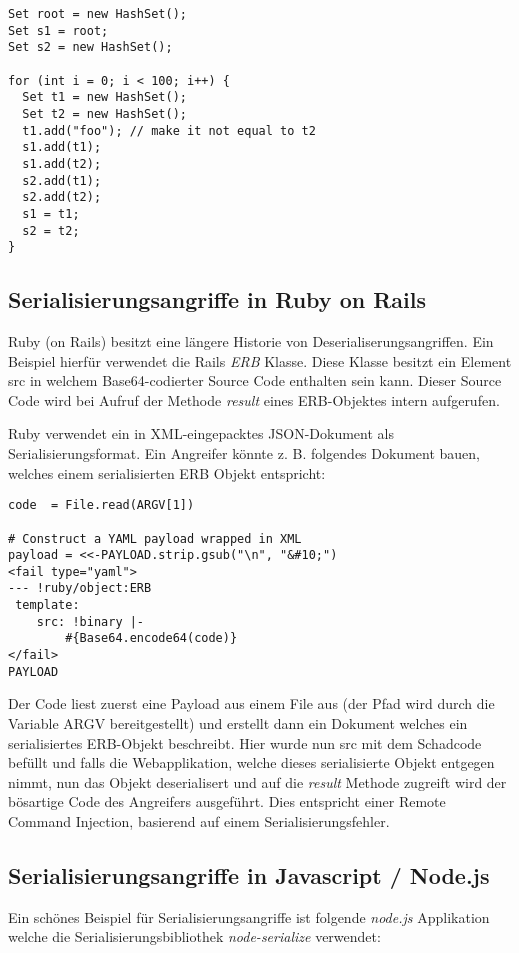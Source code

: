 \begin{verbatim}
Set root = new HashSet();
Set s1 = root;
Set s2 = new HashSet();

for (int i = 0; i < 100; i++) {
  Set t1 = new HashSet();
  Set t2 = new HashSet();
  t1.add("foo"); // make it not equal to t2
  s1.add(t1);
  s1.add(t2);
  s2.add(t1);
  s2.add(t2);
  s1 = t1;
  s2 = t2;
}
\end{verbatim}

\subsection{Serialisierungsangriffe in Ruby on Rails}

Ruby (on Rails) besitzt eine längere Historie von Deserialiserungsangriffen. Ein Beispiel hierfür verwendet die Rails \textit{ERB} Klasse. Diese Klasse besitzt ein Element src in welchem Base64-codierter Source Code enthalten sein kann. Dieser Source Code wird bei Aufruf der Methode \textit{result} eines ERB-Objektes intern aufgerufen.

Ruby verwendet ein in XML-eingepacktes JSON-Dokument als Serialisierungsformat. Ein Angreifer könnte z. B. folgendes Dokument bauen, welches einem serialisierten ERB Objekt entspricht:

\begin{verbatim}
code  = File.read(ARGV[1])

# Construct a YAML payload wrapped in XML
payload = <<-PAYLOAD.strip.gsub("\n", "&#10;")
<fail type="yaml">
--- !ruby/object:ERB
 template:
    src: !binary |-
        #{Base64.encode64(code)}
</fail>
PAYLOAD
\end{verbatim}

Der Code liest zuerst eine Payload aus einem File aus (der Pfad wird durch die Variable ARGV bereitgestellt) und erstellt dann ein Dokument welches ein serialisiertes ERB-Objekt beschreibt. Hier wurde nun src mit dem Schadcode befüllt und falls die Webapplikation, welche dieses serialisierte Objekt entgegen nimmt, nun das Objekt deserialisert und auf die \textit{result} Methode zugreift wird der bösartige Code des Angreifers ausgeführt. Dies entspricht einer Remote Command Injection, basierend auf einem Serialisierungsfehler.

\subsection{Serialisierungsangriffe in Javascript / Node.js}

Ein schönes Beispiel für Serialisierungsangriffe ist folgende \textit{node.js} Applikation welche die Serialisierungsbibliothek \textit{node-serialize} verwendet:

